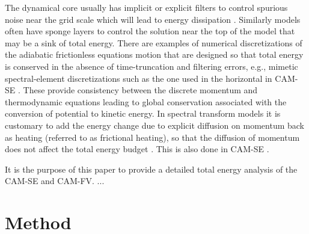 \documentclass{agujournal}
\begin{document}
The dynamical core usually has implicit or explicit filters to control spurious noise near the grid scale which will lead to energy dissipation \citep{T2008JCP,JW2010LNCSE}. Similarly models often have sponge layers to control the solution near the top of the model that may be a sink of total energy. There are examples of numerical discretizations of the adiabatic frictionless equations motion that are designed so that total energy is conserved in the absence of time-truncation and filtering errors, e.g., mimetic spectral-element discretizations such as the one used in the horizontal in CAM-SE \citep{T2011LNCSEb}. These provide consistency between the discrete momentum and thermodynamic equations leading to global conservation associated with the conversion of potential to kinetic energy. In spectral transform models it is customary to add the energy change due to explicit diffusion on momentum back as heating (referred to as frictional heating), so that the diffusion of momentum does not affect the total energy budget \citep[see, e.g., p.71 in ][]{CAM5}. This is also done in CAM-SE \citep{LetAl2018JAMES}. 

It is the purpose of this paper to provide a detailed total energy analysis of the CAM-SE and CAM-FV. ...



\section{Method}
\end{document}
